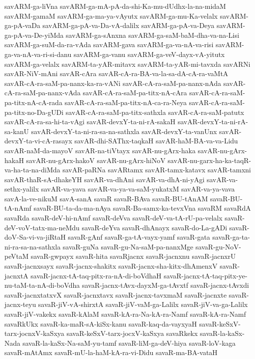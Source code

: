 {savARM-ga-liVna
savARM-ga-mA-pA-da-shi-Ka-mu-dUdhx-la-na-midaM
savARM-gamaM
savARM-ga-ma-ya-vAyutx
savARM-ga-mu-Ka-velalx
savARM-ga-pA-vaDa
savARM-ga-pA-va-Da-vA-dalilx
savARM-ga-pA-va-Deya
savARM-ga-pA-va-De-yiMda
savARM-ga-sAnxna
savARM-ga-saM-baM-dha-va-na-Lisi
savARM-ga-suM-da-ra-vAda
savARM-gava
savARM-ga-va-nA-va-risi
savARM-ga-va-nA-va-ri-si-danu
savARM-ga-vanu
savARM-ga-veV-dayx-vA-yitutx
savARM-ga-velalx
savARM-ta-yAR-mitavx
savARM-ta-yAR-mi-tavxda
savARNi
savAR-NiV-mAni
savAR-cAra
savAR-cA-ra-BA-va-la-sa-dA-cA-ra-vaMtA
savAR-cA-ra-saM-pa-nanx-ka-ra-vANi
savAR-cA-ra-saM-pa-nanx-nAda
savAR-cA-ra-saM-pa-nanx-vAda
savAR-cA-ra-saM-pa-titx-nA-cAra
savAR-cA-ra-saM-pa-titx-nA-cA-rada
savAR-cA-ra-saM-pa-titx-nA-ca-ra-Neya
savAR-cA-ra-saM-pa-titx-no-Da-gUDi
savAR-cA-ra-saM-pa-titx-sathxla
savAR-cA-ra-saM-patutx
savAR-cA-ra-sa-hi-ta-vAgi
savAR-devxY-ta-ni-rA-sakaH
savAR-devxY-ta-ni-rA-sa-kanU
savAR-devxY-ta-ni-ra-sa-na-sathxla
savAR-devxY-ta-vanUnx
savAR-devxY-ta-vi-cA-rasayx
savAR-dhi-SAThx-taqkaH
savAR-haM-BA-va-va-Lidu
savAR-naM-da-mayoV
savAR-na-tiVtayx
savAR-nu-gArx-haka
savAR-nu-gArx-hakaH
savAR-nu-gArx-hakoV
savAR-nu-gArx-hiNoV
savAR-nu-garx-ha-ka-taqR-va-ha-ta-na-diMda
savAR-paRNa
savARtamx
savAR-tamx-katavx
savAR-tamxni
savAR-thaR-sA-dhakeYH
savAR-va-dhAni
savAR-va-dhA-ni-yAgi
savAR-va-sethx-yalilx
savAR-va-yava
savAR-va-ya-va-saM-yukatxM
savAR-va-ya-vava
savA-la-ve-nikuM
savA-sanA
savaR
savaR-BAva
savaR-BU-tAnAM
savaR-BU-tA-nAmf
savaR-BU-ta-da-ma-nAya
savaR-Ba-samx-ka-tevxVna
savaRM
savaRdA
savaRda
savaR-deV-hi-nAmf
savaR-deVva
savaR-deV-va-tA-rU-pa-velalx
savaR-deV-voV-tatx-ma-neMdu
savaR-deYva
savaR-dhAnayx
savaR-do-La-gADi
savaR-doV-Sa-vi-va-jiRtaH
savaR-gAnf
savaR-ga-tA-vayx-yamf
savaR-gata
savaR-ga-ta-ni-ra-sa-na-sathxla
savaR-guNa
savaR-gu-Na-saM-pa-nanxMge
savaR-gu-NoV-peVtaM
savaR-gwpayx
savaR-hita
savaRjacnx
savaR-jacnxnu
savaR-jacnxrU
savaR-jacnxsayx
savaR-jacnx-shakitx
savaR-jacnx-sha-kitx-dhAmenxV
savaR-jacnxtA
savaR-jacnx-tA-taq-pitx-ra-nA-di-boVdhaH
savaR-jacnx-tA-taq-pitx-ye-nu-taM-ta-nA-di-boVdha
savaR-jacnx-tAvx-dayxM-ga-tAvxtf
savaR-jacnx-tAvxdi
savaR-jacnxtatxvX
savaR-jacnxtavx
savaR-jacnx-tavxmaM
savaR-jacnxte
savaR-jacnx-teyu
savaR-jiV-vA-shirxtA
savaR-jiV-vaM-ga-Lalilx
savaR-jiV-va-ga-Lalilx
savaR-jiV-vakekx
savaR-kAlaM
savaR-kA-ra-Na-kA-ra-Namf
savaR-kA-ra-Namf
savaRkUkx
savaR-ka-maR-sA-kiSx-kanu
savaR-kaq-da-vayxyaH
savaR-keSxV-tarx-jocnxV-kaSxya
savaR-keSxV-tarx-jocxV-kaSxya
savaRkekx
savaR-la-kaSx-Nada
savaR-la-kaSx-Na-saM-yu-tamf
savaR-liM-ga-deV-hiya
savaR-loV-kaga
savaR-mAtAmx
savaR-mU-la-haM-kA-ra-vi-Didu
savaR-ma-BA-vataH
}
